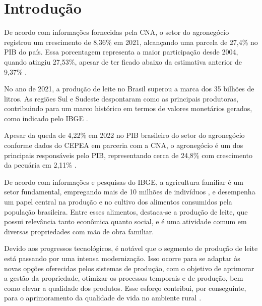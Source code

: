 
\chapter{Introdução}\label{cap:introducao}
De acordo com informações fornecidas pela \gls{CNA}, o setor do agronegócio registrou um crescimento de 8,36\% em 2021, alcançando uma parcela de 27,4\% no \gls{PIB} do país. Essa porcentagem representa a maior participação desde 2004, quando atingiu 27,53\%, apesar de ter ficado abaixo da estimativa anterior de 9,37\% \cite{CNA:2021:PesquisaPecuariaMunicipal2020}.

No ano de 2021, a produção de leite no Brasil superou a marca dos 35 bilhões de litros. As regiões Sul e Sudeste despontaram como as principais produtoras, contribuindo para um marco histórico em termos de valores monetários gerados, como indicado pelo \gls{IBGE} \cite{IBGE:2021:ProducaoAgropecuaria}.

Apesar da queda de 4,22\% em 2022 no \gls{PIB} brasileiro do setor do agronegócio conforme dados do \gls{CEPEA} em parceria com a \gls{CNA}, o agronegócio é um dos principais responsáveis pelo \gls{PIB}, representando cerca de 24,8\% com crescimento da pecuária em 2,11\% \cite{CEPEA:2023:PIBAgronegocio}.

De acordo com informações e pesquisas do \gls{IBGE}, a agricultura familiar é um setor fundamental, empregando mais de 10 milhões de indivíduos \cite{IBGE:2019:CensoAgropecuario2017}, e desempenha um papel central na produção e no cultivo dos alimentos consumidos pela população brasileira. Entre esses alimentos, destaca-se a produção de leite, que possui relevância tanto econômica quanto social, e é uma atividade comum em diversas propriedades com mão de obra familiar.

Devido aos progressos tecnológicos, é notável que o segmento de produção de leite está passando por uma intensa modernização. Isso ocorre para se adaptar às novas opções oferecidas pelos sistemas de produção, com o objetivo de aprimorar a gestão da propriedade, otimizar os processos temporais e de produção, bem como elevar a qualidade dos produtos. Esse esforço contribui, por conseguinte, para o aprimoramento da qualidade de vida no ambiente rural \cite{Botega:JVL:2007:DiagnosticoAutomacaoProducaoLeiteira}.

